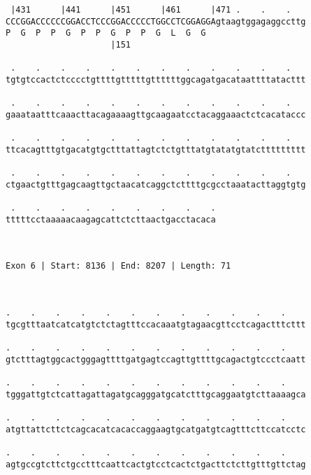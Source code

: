 \documentclass{article}
\begin{document}
\begin{Verbatim}
 |431      |441      |451      |461      |471 .    .    .   
CCCGGACCCCCCGGACCTCCCGGACCCCCTGGCCTCGGAGGAgtaagtggagaggccttg
P  G  P  P  G  P  P  G  P  P  G  L  G  G                    
                     |151                                   
  
 .    .    .    .    .    .    .    .    .    .    .    .   
tgtgtccactctcccctgttttgtttttgttttttggcagatgacataattttatacttt
                                                            
 .    .    .    .    .    .    .    .    .    .    .    .   
gaaataatttcaaacttacagaaaagttgcaagaatcctacaggaaactctcacataccc
                                                            
 .    .    .    .    .    .    .    .    .    .    .    .   
ttcacagtttgtgacatgtgctttattagtctctgtttatgtatatgtatcttttttttt
                                                            
 .    .    .    .    .    .    .    .    .    .    .    .   
ctgaactgtttgagcaagttgctaacatcaggctcttttgcgcctaaatacttaggtgtg
                                                            
 .    .    .    .    .    .    .    .    .
tttttcctaaaaacaagagcattctcttaactgacctacaca
                                          
                                          
 
Exon 6 | Start: 8136 | End: 8207 | Length: 71



.    .    .    .    .    .    .    .    .    .    .    .    
tgcgtttaatcatcatgtctctagtttccacaaatgtagaacgttcctcagactttcttt
                                                            
.    .    .    .    .    .    .    .    .    .    .    .    
gtctttagtggcactgggagttttgatgagtccagttgttttgcagactgtccctcaatt
                                                            
.    .    .    .    .    .    .    .    .    .    .    .    
tgggattgtctcattagattagatgcagggatgcatctttgcaggaatgtcttaaaagca
                                                            
.    .    .    .    .    .    .    .    .    .    .    .    
atgttattcttctcagcacatcacaccaggaagtgcatgatgtcagtttcttccatcctc
                                                            
.    .    .    .    .    .    .    .    .    .    .    .    
agtgccgtcttctgcctttcaattcactgtcctcactctgacttctcttgtttgttctag
                                                            

\end{Verbatim}
\end{document}
